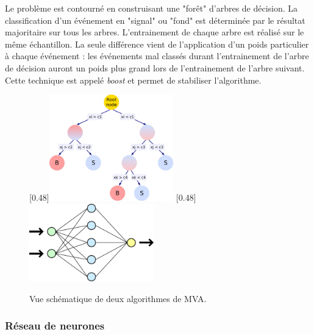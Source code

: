 Le problème est contourné en construisant une "forêt" d'arbres de décision. La classification d'un événement en "signal" ou "fond" est déterminée par le résultat majoritaire sur tous les arbres. L'entrainement de chaque arbre est réalisé sur le même échantillon. La seule différence vient de l'application d'un poids particulier à chaque événement : les événements mal classés durant l'entrainement de l'arbre de décision auront un poids plus grand lors de l'entrainement de l'arbre suivant. Cette technique est appelé \emph{boost} \citep{Freund1997119} et permet de stabiliser l'algorithme.

\begin{figure}[t!] \centering
    [0.48\textwidth]{\includegraphics[width=0.48\textwidth]{chapitre6/figs/BDT.pdf}} \hfill
    [0.48\textwidth]{\includegraphics[width=0.48\textwidth]{chapitre6/figs/Neural_network.pdf}}
    \caption{Vue schématique de deux algorithmes de MVA.}
\end{figure}

\subsubsection{Réseau de neurones}

